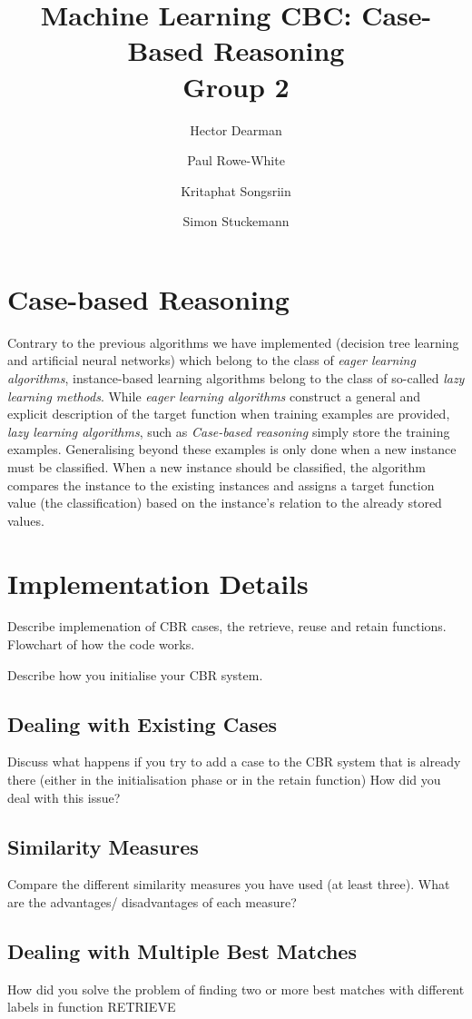 \documentclass[10pt,a4paper]{article}
\author{Hector Dearman \and Paul Rowe-White \and Kritaphat Songsriin \and Simon Stuckemann}
\title{Machine Learning CBC: Case-Based Reasoning\\Group 2}
\begin{document}
\maketitle

\section{Case-based Reasoning}
Contrary to the previous algorithms we have implemented (decision tree learning and artificial neural networks) which belong to the class of \emph{eager learning algorithms}, instance-based learning algorithms belong to the class  of so-called \emph{lazy learning methods}. 
While \emph{eager learning algorithms} construct a general and explicit description of the target function when training examples are provided, \emph{lazy learning algorithms}, such as \emph{Case-based reasoning} simply store the training examples. Generalising beyond these examples is only done when a new instance must be classified. When a new instance should be classified, the algorithm compares the instance to the existing instances and assigns a target function value (the classification) based on the instance's relation to the already stored values.

\section{Implementation Details}
Describe implemenation of CBR cases, the retrieve, reuse and retain functions. Flowchart of how the code works.

Describe how you initialise your CBR system.

\subsection{Dealing with Existing Cases}
Discuss what happens if you try to add a case to the CBR system that is already there (either in the initialisation phase or in the retain function) How did you deal with this issue?

\subsection{Similarity Measures}
Compare the different similarity measures you have used (at least three). What are the advantages/ disadvantages of each measure?

\subsection{Dealing with Multiple Best Matches}
How did you solve the problem of finding two or more best matches with different labels in function RETRIEVE
\end{document}
